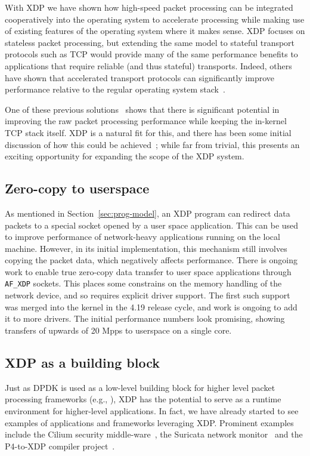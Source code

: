\documentclass[sigconf]{acmart}
\begin{document}
With XDP we have shown how high-speed packet processing can be integrated
cooperatively into the operating system to accelerate processing while making
use of existing features of the operating system where it makes sense. XDP
focuses on stateless packet processing, but extending the same model to stateful
transport protocols such as TCP would provide many of the same performance
benefits to applications that require reliable (and thus stateful) transports.
Indeed, others have shown that accelerated transport protocols can significantly
improve performance relative to the regular operating system
stack~\cite{stackmap,sandstorm,belay2014ix,jeong2014mtcp}.

One of these previous solutions~\cite{stackmap} shows that there is significant
potential in improving the raw packet processing performance while keeping the
in-kernel TCP stack itself. XDP is a natural fit for this, and there has been
some initial discussion of how this could be achieved~\cite{txdp}; while far
from trivial, this presents an exciting opportunity for expanding the scope of
the XDP system.

\subsection{Zero-copy to userspace}
\label{sec:zero-copy-userspace}

As mentioned in Section~\ref{sec:prog-model}, an XDP program can redirect data
packets to a special socket opened by a user space application. This can be used
to improve performance of network-heavy applications running on the local
machine. However, in its initial implementation, this mechanism still involves
copying the packet data, which negatively affects performance. There is ongoing
work to enable true zero-copy data transfer to user space applications through
\texttt{AF\_XDP} sockets. This places some constrains on the memory handling of
the network device, and so requires explicit driver support. The first such
support was merged into the kernel in the 4.19 release cycle, and work is
ongoing to add it to more drivers. The initial performance numbers look
promising, showing transfers of upwards of 20 Mpps to userspace on a single
core.

\subsection{XDP as a building block}
\label{sec:xdp-building-block}

Just as DPDK is used as a low-level building block for higher level packet
processing frameworks (e.g., \cite{linguaglossa2017high}), XDP has the potential
to serve as a runtime environment for higher-level applications. In fact, we
have already started to see examples of applications and frameworks leveraging
XDP. Prominent examples include the Cilium security middle-ware~\cite{cilium},
the Suricata network monitor~\cite{suricata} and the P4-to-XDP compiler
project~\cite{p4xdp}.
\end{document}
